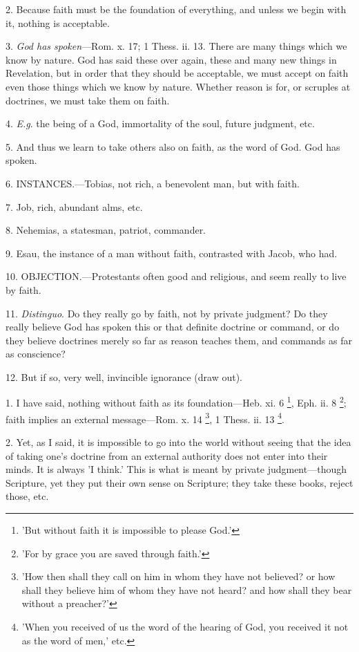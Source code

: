 2. Because faith must be the foundation of
everything, and unless we begin with it, nothing is acceptable.

3. \emph{God has spoken}—Rom. x. 17; 1 Thess.
ii. 13. There are many things which we know by nature. God has said
these over again, these and many new things in Revelation, but in
order that they should be acceptable, we must accept on faith even
those things which we know by nature. Whether reason is for, or
scruples at doctrines, we must take them on faith.

4. \emph{E.g}. the being of a God, immortality of
the soul, future judgment, etc.

5. And thus we learn to take others also on
faith, as the word of God. God has spoken.

6. INSTANCES.—Tobias,
not rich, a benevolent man, but with faith.

7. Job, rich, abundant alms, etc.

8. Nehemias, a statesman, patriot, commander.

9. Esau, the instance of a man without faith,
contrasted with Jacob, who had.

10. OBJECTION.—Protestants
often good and religious, and seem really to live by faith.

11. \emph{Distinguo}. Do they really go by faith,
not by private judgment? Do they really believe God has spoken this or
that definite doctrine or command, or do they believe doctrines merely
so far as reason teaches them, and commands as far as conscience?

12. But if so, very well, invincible ignorance
(draw out).


1. I have said, nothing without faith as its
foundation—Heb. xi. 6 \footnote{'But without faith it is
impossible to please God.'},
Eph. ii. 8 \footnote{'For by grace you are
saved through faith.'}; faith
implies an external message—Rom. x. 14 \footnote{'How then shall they
call on him in whom they have not believed? or how shall they believe
him of whom they have not heard? and how shall they bear without a
preacher?'}, 1 Thess. ii. 13 \footnote{'When you received of us
the word of the hearing of God, you received it not as the word of
men,' etc.}.

2. Yet, as I said, it is impossible to go into
the world without seeing that the idea of taking one's doctrine from
an external authority does not enter into their minds. It is always 'I
think.' This is what is meant by private judgment—though Scripture,
yet they put their own sense on Scripture; they take these books,
reject those, etc.

